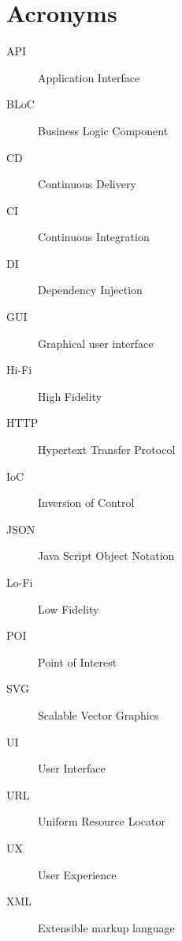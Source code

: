 \chapter{Acronyms}\label{ch:acronyms}
\begin{description}
	\item[API] Application Interface
	\item[BLoC] Business Logic Component
	\item[CD] Continuous Delivery
	\item[CI] Continuous Integration
	\item[DI] Dependency Injection
	\item[GUI] Graphical user interface
	\item[Hi-Fi] High Fidelity
	\item[HTTP] Hypertext Transfer Protocol
	\item[IoC] Inversion of Control
	\item[JSON] Java Script Object Notation
	\item[Lo-Fi] Low Fidelity
	\item[POI] Point of Interest
	\item[SVG] Scalable Vector Graphics
	\item[UI] User Interface
	\item[URL] Uniform Resource Locator
	\item[UX] User Experience
	\item[XML] Extensible markup language
\end{description}
